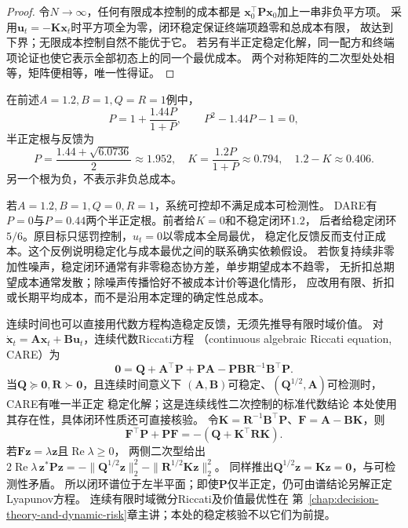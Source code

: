\begin{proof}
令$N\to\infty$，任何有限成本控制的成本都是
$\bm x_0^\top\bm P\bm x_0$加上一串非负平方项。
采用$\bm u_t=-\bm K\bm x_t$时平方项全为零，闭环稳定保证终端项趋零和总成本有限，
故达到下界；无限成本控制自然不能优于它。
若另有半正定稳定化解，同一配方和终端项论证也使它表示全部初态上的同一个最优成本。
两个对称矩阵的二次型处处相等，矩阵便相等，唯一性得证。
\end{proof}

在前述$A=1.2,B=1,Q=R=1$例中，
\[
  P=1+\frac{1.44P}{1+P},
  \qquad P^2-1.44P-1=0,
\]
半正定根与反馈为
\[
  P=\frac{1.44+\sqrt{6.0736}}2\approx1.952,
  \quad K=\frac{1.2P}{1+P}\approx0.794,
  \quad 1.2-K\approx0.406.
\]
另一个根为负，不表示非负总成本。

若$A=1.2,B=1,Q=0,R=1$，系统可控却不满足成本可检测性。
DARE有$P=0$与$P=0.44$两个半正定根。前者给$K=0$和不稳定闭环$1.2$，
后者给稳定闭环$5/6$。原目标只惩罚控制，$u_t=0$以零成本全局最优，
稳定化反馈反而支付正成本。这个反例说明稳定化与成本最优之间的联系确实依赖假设。
若恢复持续非零加性噪声，稳定闭环通常有非零稳态协方差，单步期望成本不趋零，
无折扣总期望成本通常发散；除噪声传播恰好不被成本计价等退化情形，
应改用有限、折扣或长期平均成本，而不是沿用本定理的确定性总成本。

连续时间也可以直接用代数方程构造稳定反馈，无须先推导有限时域价值。
对$\dot{\bm x}_t=\bm A\bm x_t+\bm B\bm u_t$，连续代数Riccati方程
（continuous algebraic Riccati equation, CARE）为
\begin{equation}
  \bm0=\bm Q+\bm A^\top\bm P+\bm P\bm A
       -\bm P\bm B\bm R^{-1}\bm B^\top\bm P.
  \label{eq:control-care}
\end{equation}
当$\bm Q\succeq\bm0,\bm R\succ\bm0$，且连续时间意义下
$(\bm A,\bm B)$可稳定、$(\bm Q^{1/2},\bm A)$可检测时，CARE有唯一半正定
稳定化解；这是连续线性二次控制的标准代数结论
本处使用其存在性，具体闭环性质还可直接核验。
令$\bm K=\bm R^{-1}\bm B^\top\bm P$、$\bm F=\bm A-\bm B\bm K$，则
\[
  \bm F^\top\bm P+\bm P\bm F=-(\bm Q+\bm K^\top\bm R\bm K).
\]
若$\bm F\bm z=\lambda\bm z$且$\operatorname{Re}\lambda\geq0$，
两侧二次型给出
$2\operatorname{Re}\lambda\,\bm z^\ast\bm P\bm z
=-\|\bm Q^{1/2}\bm z\|_2^2-\|\bm R^{1/2}\bm K\bm z\|_2^2$。
同样推出$\bm Q^{1/2}\bm z=\bm K\bm z=\bm0$，与可检测性矛盾。
所以闭环谱位于左半平面；即使$\bm P$仅半正定，仍可由谱结论另解正定Lyapunov方程。
连续有限时域微分Riccati及价值最优性在
第~\ref{chap:decision-theory-and-dynamic-risk}章主讲；本处的稳定核验不以它们为前提。

